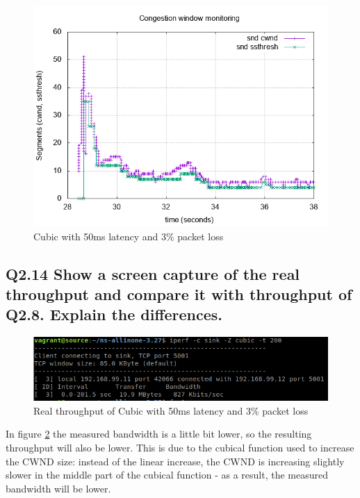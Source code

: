 \documentclass{article}
\begin{document}
\begin{figure}[h]
    \centering
    \includegraphics[scale=0.5]{images/lab1-group11-task2-question13.png}
    \caption{Cubic with 50ms latency and 3\% packet loss }
    \label{fig:lab1-group11-task2-question13}
\end{figure}

\subsection{Q2.14 Show a screen capture of the real throughput and
compare it with throughput of Q2.8.
Explain the differences.}

\begin{figure}[h]
    \centering
    \includegraphics[scale=0.6]{images/lab1-group11-task2-question14.png}
    \caption{Real throughput of Cubic with 50ms latency and 3\% packet loss }
    \label{fig:lab1-group11-task2-question14}
\end{figure}

In figure \ref{fig:lab1-group11-task2-question14} the measured bandwidth is a little bit lower, so the resulting throughput will also be lower. This is due to the cubical function used to increase the CWND size: instead of the linear increase, the CWND is increasing slightly slower in the middle part of the cubical function - as a result, the measured bandwidth will be lower.
\end{document}

